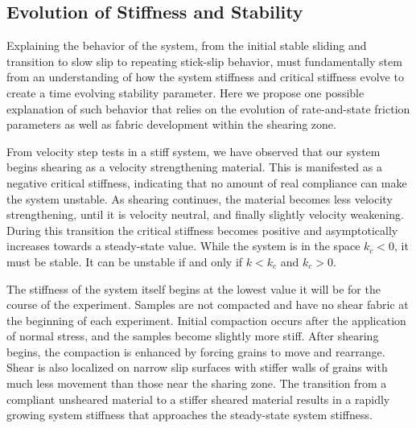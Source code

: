 \subsection{Evolution of Stiffness and Stability}
Explaining the behavior of the system, from the initial stable sliding and transition to slow slip to repeating stick-slip behavior, must fundamentally stem from an understanding of how the system stiffness and critical stiffness evolve to create a time evolving stability parameter. Here we propose one possible explanation of such behavior that relies on the evolution of rate-and-state friction parameters as well as fabric development within the shearing zone. 

From velocity step tests in a stiff system, we have observed that our system begins shearing as a velocity strengthening material. This is manifested as a negative critical stiffness, indicating that no amount of real compliance can make the system unstable. As shearing continues, the material becomes less velocity strengthening, until it is velocity neutral, and finally slightly velocity weakening. During this transition the critical stiffness becomes positive and asymptotically increases towards a steady-state value. While the system is in the space $k_c<0$, it must be stable. It can be unstable if and only if $k<k_c$ and $k_c>0$.

The stiffness of the system itself begins at the lowest value it will be for the course of the experiment. Samples are not compacted and have no shear fabric at the beginning of each experiment. Initial compaction occurs after the application of normal stress, and the samples become slightly more stiff. After shearing begins, the compaction is enhanced by forcing grains to move and rearrange. Shear is also localized on narrow slip surfaces with stiffer walls of grains with much less movement than those near the sharing zone. The transition from a compliant unsheared material to a stiffer sheared material results in a rapidly growing system stiffness that approaches the steady-state system stiffness.

